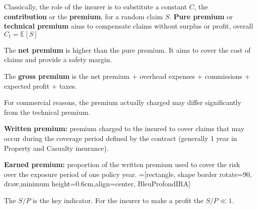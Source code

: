 \begin{f}
Classically, the role of the insurer is to substitute a constant \(C\), the \textbf{contribution} or the \textbf{premium}, for a random claim \(S\).
\textbf{Pure premium} or \textbf{technical premium} aims 
to compensate claims without surplus or profit, overall \(C_t = \mathbb{E}[S]\)
	
	The \textbf{net premium} is higher than the pure premium. It aims to cover the cost of claims and provide a safety margin.
	
	The \textbf{gross premium} is the net premium + overhead expenses + commissions + expected profit + taxes.
	
	For commercial reasons, the premium actually charged may differ significantly from the technical premium.

	\textbf{Written premium:} premium charged to the insured to cover claims that may occur during the 
coverage period defined by the contract (generally 1 year in Property and Casualty insurance).

\textbf{Earned premium:} proportion of the written premium used to cover the risk over the exposure period of 
one policy year.
=[rectangle, shape border rotate=90, draw,minimum height=0.6cm,align=center, BleuProfondIRA]

\resizebox{\linewidth}{!}
{
}
The \(S/P\) is the key indicator. For the insurer to make a profit the \(S/P\ll 1\).
\end{f}

